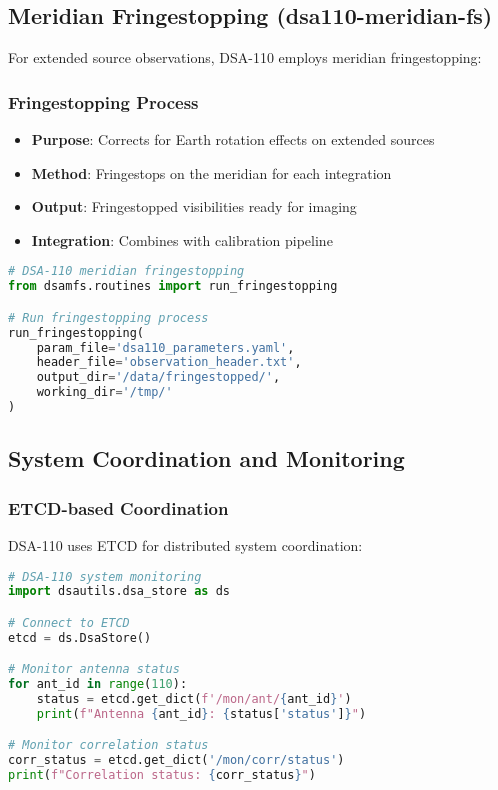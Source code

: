 \documentclass[11pt]{article}
\begin{document}
\subsection{Meridian Fringestopping (dsa110-meridian-fs)}

For extended source observations, DSA-110 employs meridian fringestopping:

\subsubsection{Fringestopping Process}
\begin{itemize}
    \item \textbf{Purpose}: Corrects for Earth rotation effects on extended sources
    \item \textbf{Method}: Fringestops on the meridian for each integration
    \item \textbf{Output}: Fringestopped visibilities ready for imaging
    \item \textbf{Integration}: Combines with calibration pipeline
\end{itemize}

\begin{lstlisting}[language=Python]
# DSA-110 meridian fringestopping
from dsamfs.routines import run_fringestopping

# Run fringestopping process
run_fringestopping(
    param_file='dsa110_parameters.yaml',
    header_file='observation_header.txt',
    output_dir='/data/fringestopped/',
    working_dir='/tmp/'
)
\end{lstlisting}

\subsection{System Coordination and Monitoring}

\subsubsection{ETCD-based Coordination}
DSA-110 uses ETCD for distributed system coordination:

\begin{lstlisting}[language=Python]
# DSA-110 system monitoring
import dsautils.dsa_store as ds

# Connect to ETCD
etcd = ds.DsaStore()

# Monitor antenna status
for ant_id in range(110):
    status = etcd.get_dict(f'/mon/ant/{ant_id}')
    print(f"Antenna {ant_id}: {status['status']}")

# Monitor correlation status
corr_status = etcd.get_dict('/mon/corr/status')
print(f"Correlation status: {corr_status}")
\end{lstlisting}
\end{document}
